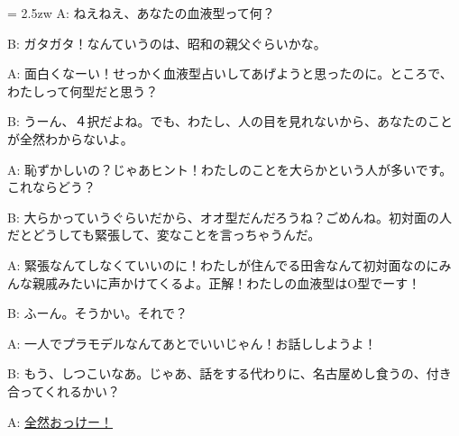 \documentclass[11pt]{amsart}
\title{}
\author{}
\newenvironment{hangall}[1]{\hangindent = 2.5zw\everypar{\hangindent = 2.5zw}}{}
\begin{document}
\maketitle
\begin{hangall}{}%
A: ねえねえ、あなたの血液型って何？

B: ガタガタ！なんていうのは、昭和の親父ぐらいかな。

A: 面白くなーい！せっかく血液型占いしてあげようと思ったのに。ところで、わたしって何型だと思う？

B: うーん、４択だよね。でも、わたし、人の目を見れないから、あなたのことが全然わからないよ。

A: 恥ずかしいの？じゃあヒント！わたしのことを大らかという人が多いです。これならどう？

B: 大らかっていうぐらいだから、オオ型だんだろうね？ごめんね。初対面の人だとどうしても緊張して、変なことを言っちゃうんだ。

A: 緊張なんてしなくていいのに！わたしが住んでる田舎なんて初対面なのにみんな親戚みたいに声かけてくるよ。正解！わたしの血液型はO型でーす！

B: ふーん。そうかい。それで？

A: 一人でプラモデルなんてあとでいいじゃん！お話ししようよ！

B: もう、しつこいなあ。じゃあ、話をする代わりに、名古屋めし食うの、付き合ってくれるかい？

A: \ul{全然おっけー！}\end{hangall}
\end{document}
